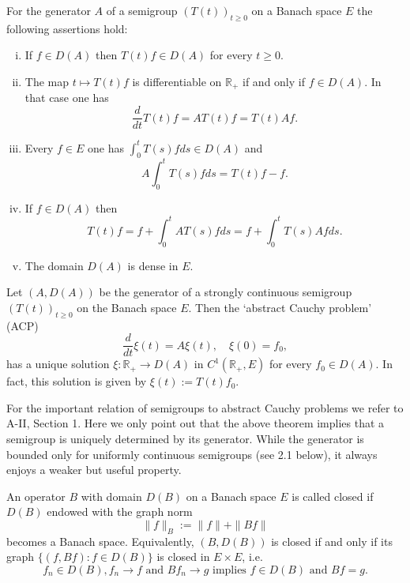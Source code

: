 \begin{proposition}
For the generator $A$ of a semigroup $(T(t))_{t \geq 0}$ on a Banach space $E$ the following assertions hold:

\begin{enumerate}[(i)]
\item
If $f \in D(A)$ then $T(t)f \in D(A)$ for every $t \geq 0$.

\item
The map $t \mapsto T(t)f$ is differentiable on $\mathbb{R}_{+}$ if and only if $f \in D(A)$.
In that case one has
\begin{equation}
\frac{d}{dt}T(t)f = AT(t)f = T(t)Af.
\end{equation}
\item
Every $f \in E$ one has $\int_0^{t} T(s)f ds \in D(A)$ and
\begin{equation}
A\int_0^{t} T(s)f ds = T(t)f - f.
\end{equation}
\item
If $f \in D(A)$ then
\[
T(t)f = f + \int_0^{t} AT(s)f ds = f + \int_0^{t} T(s)Af ds.
\]
\item
The domain $D(A)$ is dense in $E$.

\end{enumerate}
\end{proposition}
\begin{theorem}
Let $(A,D(A))$ be the generator of a strongly continuous semigroup $(T(t))_{t \geq 0}$ on the Banach space $E$.
Then the \enquote*{abstract Cauchy problem} (ACP)
\[
\frac{d}{dt}\xi(t) = A\xi(t), \quad \xi(0) = f_0,
\]
has a unique solution $\xi: \mathbb{R}_{+} \to D(A)$ in $C^{1}(\mathbb{R}_{+},E)$ for every $f_0 \in D(A)$.
In fact, this solution is given by $\xi(t) := T(t)f_0$.
\end{theorem}
For the important relation of semigroups to abstract Cauchy problems we refer to A-II, Section 1.
Here we only point out that the above theorem implies that a semigroup is uniquely determined by its generator.
While the generator is bounded only for uniformly continuous semigroups (see 2.1 below), it always enjoys a weaker but useful property.
\begin{definition}
An operator $B$ with domain $D(B)$ on a Banach space $E$ is called closed if $D(B)$ endowed with the graph norm
\[
\|f\|_{B} := \|f\| + \|Bf\|
\]
becomes a Banach space.
Equivalently, $(B,D(B))$ is closed if and only if its graph $\{(f,Bf): f \in D(B)\}$ is closed in $E \times E$, i.e.
\begin{equation}
f_{n} \in D(B), f_{n} \to f \text{ and } Bf_{n} \to g \text{ implies } f \in D(B) \text{ and } Bf = g.
\end{equation}
\end{definition}
